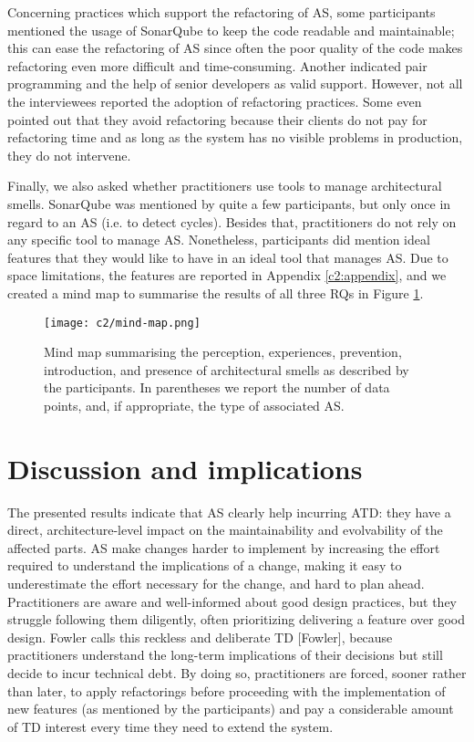 Concerning practices which support the refactoring of AS, some participants mentioned the usage of SonarQube to keep the code readable and maintainable; this can ease the refactoring of AS since often the poor quality of the code makes refactoring even more difficult and time-consuming. Another indicated pair programming and the help of senior developers as valid support. However, not all the interviewees reported the adoption of refactoring practices. Some even pointed out that they avoid refactoring because their clients do not pay for refactoring time and as long as the system has no visible problems in production, they do not intervene.

Finally, we also asked whether practitioners use tools to manage architectural smells. SonarQube was mentioned by quite a few participants, but only once in regard to an AS (i.e. to detect cycles). Besides that, practitioners do not rely on any specific tool to manage AS. Nonetheless, participants did mention ideal features that they would like to have in an ideal tool that manages AS. Due to space limitations, the features are reported in Appendix \ref{c2:appendix}, and we created a mind map to summarise the results of all three RQs in Figure \ref{fig:c2:mind-map}.

\begin{figure}
	\centering
	\texttt{[image: c2/mind-map.png]}
	\caption{Mind map summarising the perception, experiences, prevention, introduction, and presence of architectural smells as described by the participants. In parentheses we report the number of data points, and, if appropriate, the type of associated AS.}\label{fig:c2:mind-map}
\end{figure}

\section{Discussion and implications}
The presented results indicate that AS clearly help incurring ATD: they have a direct, architecture-level impact on the maintainability and evolvability of the affected parts. AS make changes harder to implement by increasing the effort required to understand the implications of a change, making it easy to underestimate the effort necessary for the change, and hard to plan ahead. Practitioners are aware and well-informed about good design practices, but they struggle following them diligently, often prioritizing delivering a feature over good design. Fowler calls this reckless and deliberate TD [Fowler], because practitioners understand the long-term implications of their decisions but still decide to incur technical debt. By doing so, practitioners are forced, sooner rather than later, to apply refactorings before proceeding with the implementation of new features (as mentioned by the participants) and pay a considerable amount of TD interest every time they need to extend the system. 

